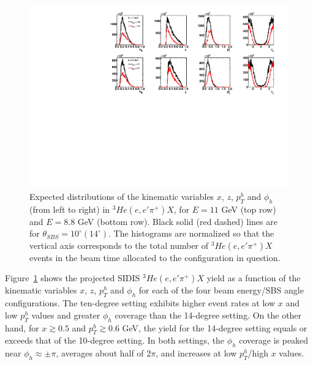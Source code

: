 \paragraph{}
\begin{figure}[h]
  \begin{center}
    \includegraphics[width=.98\textwidth]{figures/kine14deg10deg_comparison.pdf}
  \end{center}
  \caption{\label{kine14_10_1D} Expected distributions of the kinematic variables $x$, $z$, $p_T^h$ and $\phi_h$ (from left to right) in $^3He(e,e'\pi^+)X$, for $E = 11$ GeV (top row) and $E = 8.8$ GeV (bottom row). Black solid (red dashed) lines are for $\theta_{SBS} = 10^\circ (14^\circ)$. The histograms are normalized so that the vertical axis corresponds to the total number of $^3He(e,e'\pi^+)X$ events in the beam time allocated to the configuration in question.}
\end{figure}
Figure~\ref{kine14_10_1D} shows the projected SIDIS $^3He(e,e'\pi^+)X$ yield as a function of the kinematic variables $x$, $z$, $p_T^h$ and $\phi_h$ for each of the four beam energy/SBS angle configurations. The ten-degree setting exhibits higher event rates at low $x$ and low $p_T^h$ values and greater $\phi_h$ coverage than the 14-degree setting. On the other hand, for $x \gtrsim 0.5$ and $p_T^h \gtrsim 0.6$ GeV, the yield for the 14-degree setting equals or exceeds that of the 10-degree setting. In both settings, the $\phi_h$ coverage is peaked near $\phi_h \approx \pm \pi$, averages about half of 2$\pi$, and increases at low $p_T^h$/high $x$ values. 

